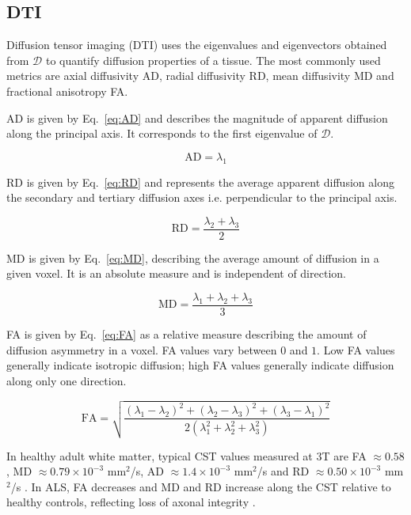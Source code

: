 \subsection{DTI}
\label{subsec:background_dti}

Diffusion tensor imaging (DTI) uses the eigenvalues and eigenvectors obtained from $\mathcal{D}$ to quantify diffusion properties of a tissue. The most commonly used metrics are axial diffusivity AD, radial diffusivity RD, mean diffusivity MD and fractional anisotropy FA.

AD is given by Eq.~\ref{eq:AD} and describes the magnitude of apparent diffusion along the principal axis. It corresponds to the first eigenvalue of $\mathcal{D}$.

\begin{equation}
    \mathrm{AD} = \lambda_1
    \label{eq:AD}
\end{equation}

RD is given by Eq.~\ref{eq:RD} and represents the average apparent diffusion along the secondary and tertiary diffusion axes i.e. perpendicular to the principal axis.

\begin{equation}
    \mathrm{RD} = \frac{\lambda_2 + \lambda_3}{2}
    \label{eq:RD}
\end{equation}

MD is given by Eq.~\ref{eq:MD}, describing the average amount of diffusion in a given voxel. It is an absolute measure and is independent of direction. 

\begin{equation}
    \mathrm{MD} = \frac{\lambda_1 + \lambda_2 + \lambda_3}{3}
    \label{eq:MD}
\end{equation}

FA is given by Eq.~\ref{eq:FA} as a relative measure describing the amount of diffusion asymmetry in a voxel. FA values vary between $0$ and $1$. Low FA values generally indicate isotropic diffusion; high FA values generally indicate diffusion along only one direction.

\begin{equation}
    \mathrm{FA} = \sqrt{\frac{(\lambda_1 - \lambda_2)^2 + (\lambda_2 - \lambda_3)^2 + (\lambda_3 - \lambda_1)^2}{2(\lambda_1^2 + \lambda_2^2 + \lambda_3^2)}}
    \label{eq:FA}
\end{equation}

In healthy adult white matter, typical CST values measured at 3T are FA $\approx 0.58$, MD $\approx 0.79 \times 10^{-3}$ mm$^2$/s, AD $\approx 1.4 \times 10^{-3}$ mm$^2$/s and RD $\approx 0.50 \times 10^{-3}$ mm$^2$/s \cite{reich2006quantitative}. In ALS, FA decreases and MD and RD increase along the CST relative to healthy controls, reflecting loss of axonal integrity \cite{sarica_corticospinal_2017}.

